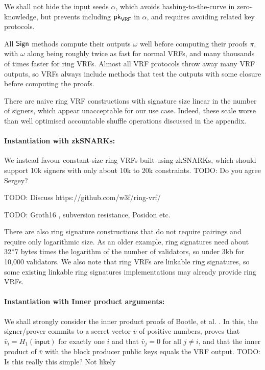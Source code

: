 We shall not hide the input seeds $\alpha$, which avoids hashing-to-the-curve in zero-knowledge, but prevents including $\mathsf{pk}_{\mathsf{VRF}}$ in $\alpha$, and requires avoiding related key protocols.

All $\mathsf{Sign}$ methods compute their outputs $\omega$ well before computing their proofs $\pi$, with $\omega$ along being roughly twice as fast for normal VRFs, and many thousands of times faster for ring VRFs.  Almost all VRF protocols throw away many VRF outputs, so VRFs always include methods that test the outputs with some closure before computing the proofs.

There are naive ring VRF constructions with signature size linear in the number of signers, which appear unacceptable for our use case.  Indeed, these scale worse than well optimised accountable shuffle operations discussed in the appendix.

\paragraph{Instantiation with zkSNARKs:}

We instead favour constant-size ring VRFs built using zkSNARKs, which should support 10k signers with only about 10k to 20k constraints.  TODO: Do you agree Sergey?

TODO:  Discuss https://github.com/w3f/ring-vrf/

TODO:  Groth16 \cite{Groth16}, subversion resistance, Posidon etc.

There are also ring signature constructions that do not require pairings and require only logarithmic size.  As an older example, ring signatures \cite{GK2015} need about 32*7 bytes times the logarithm of the number of validators, so under 3kb for 10,000 validators.  We also note that ring VRFs are linkable ring signatures, so some existing linkable ring signatures implementations may already provide ring VRFs.

\paragraph{Instantiation with Inner product arguments:}

We shall strongly consider the inner product proofs of Bootle, et al. \cite{bccgp2016}.  In this, the signer/prover commits to a secret vector $\bar{v}$ of positive numbers, proves that $\bar{v}_i = H_1(\mathsf{input})$ for exactly one $i$ and that $\bar{v}_j = 0$ for all $j \ne i$, and that the inner product of $\bar{v}$ with the block producer public keys equals the VRF output.  TODO:  Is this really this simple?  Not likely

